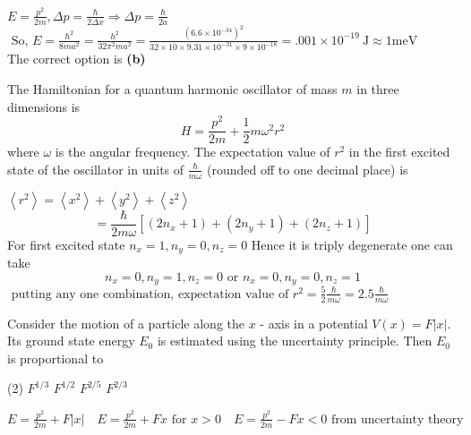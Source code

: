 \begin{enumerate}
\begin{tasks}
	\end{tasks}
	\begin{answer}
		$E=\frac{p^{2}}{2 m}, \Delta p=\frac{\hbar}{2 \Delta x} \Rightarrow \Delta p=\frac{\hbar}{2 a}$\\
		$\text { So, } E=\frac{\hbar^{2}}{8 m a^{2}}=\frac{h^{2}}{32 \pi^{2} m a^{2}}=\frac{\left(6.6 \times 10^{-34}\right)^{2}}{32 \times 10 \times 9.31 \times 10^{-31} \times 9 \times 10^{-18}}=.001 \times 10^{-19} \mathrm{~J} \approx 1 \mathrm{meV}$\\
		The correct option is \textbf{(b)}
	\end{answer}
	\begin{minipage}{\textwidth}
		\item The Hamiltonian for a quantum harmonic oscillator of mass $m$ in three dimensions is
		$$
		H=\frac{p^{2}}{2 m}+\frac{1}{2} m \omega^{2} r^{2}
		$$
		where $\omega$ is the angular frequency. The expectation value of $r^{2}$ in the first excited state of the oscillator in units of $\frac{\hbar}{m \omega}$ (rounded off to one decimal place) is
	\end{minipage}
	\begin{answer}
		$\left\langle r^{2}\right\rangle=\left\langle x^{2}\right\rangle+\left\langle y^{2}\right\rangle+\left\langle z^{2}\right\rangle$\\
		$$
		=\frac{\hbar}{2 m \omega}\left[\left(2 n_{x}+1\right)+\left(2 n_{y}+1\right)+\left(2 n_{z}+1\right)\right]
		$$
		For first excited state $n_{x}=1, n_{y}=0, n_{z}=0$
		Hence it is triply degenerate one can take
		$$
		n_{x}=0, n_{y}=1, n_{z}=0 \text { or } n_{x}=0, n_{y}=0, n_{z}=1
		$$
		$\text { putting any one combination, expectation value of } r^{2}=\frac{5}{2} \frac{\hbar}{m \omega}=2.5 \frac{\hbar}{m \omega}$
	\end{answer}
	\begin{minipage}{\textwidth}
		\item Consider the motion of a particle along the $x$ - axis in a potential $V(x)=F|x|$. Its ground state energy $E_{0}$ is estimated using the uncertainty principle. Then $E_{0}$ is proportional to
	\end{minipage}
	\begin{tasks}(2)
		\task[\textbf{A.}] $F^{1 / 3}$
		\task[\textbf{B.}] $F^{1 / 2}$
		\task[\textbf{C.}]$F^{2 / 5}$
		\task[\textbf{D.}]$F^{2 / 3}$
	\end{tasks}
	\begin{answer}
		$E=\frac{p^{2}}{2 m}+F|x| \quad E=\frac{p^{2}}{2 m}+F x \text { for } x>0 \quad E=\frac{p^{2}}{2 m}-F x<0 \text { from uncertainty theory }$\\

\end{answer}
\end{enumerate}
